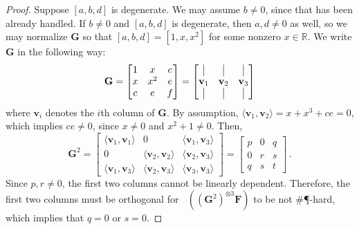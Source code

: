 \documentclass[11pt]{article}
\DeclareMathOperator{\holts}{Holant^*_3}
\newcommand{\sph}{\#\P-hard\xspace}
\newcommand{\teh}{^{\otimes 3}}
\begin{document}
\begin{proof}
  Suppose $[a, b, d]$ is degenerate.
  We may assume $b \ne 0$, since that has been already handled.
  If $b \ne 0$ and $[a, b, d]$ is degenerate, then $a, d \ne 0$ as well, so we may normalize $\mathbf{G}$ so that $[a, b, d] = [1, x, x^2]$ for some nonzero $x \in \mathbb{R}$.
  We write $\mathbf{G}$ in the following way:
  \[
    \mathbf{G} = \begin{bmatrix}
      1 & x & c \\
      x & x^2 & e \\
      c & e & f 
      \end{bmatrix} = \begin{bmatrix}
      \vrule & \vrule & \vrule \\
      \mathbf{v}_1 & \mathbf{v}_2 & \mathbf{v}_3 \\
      \vrule & \vrule & \vrule
    \end{bmatrix}
  \]
  where $\mathbf{v}_i$ denotes the $i$th column of $\mathbf{G}$. By assumption, $\langle \mathbf{v}_1, \mathbf{v}_2 \rangle = x + x^3 + ce = 0$, which implies $ce \ne 0$, since $x \ne 0$ and $x^2 + 1 \ne 0$.
  Then,
  \[
    \mathbf{G}^2 = \begin{bmatrix}
      \langle \mathbf{v}_1, \mathbf{v}_1 \rangle & 0 & \langle \mathbf{v}_1, \mathbf{v}_3 \rangle \\
      0 & \langle \mathbf{v}_2, \mathbf{v}_2 \rangle & \langle \mathbf{v}_2, \mathbf{v}_3 \rangle \\
      \langle \mathbf{v}_1, \mathbf{v}_3 \rangle & \langle \mathbf{v}_2, \mathbf{v}_3 \rangle & \langle \mathbf{v}_3, \mathbf{v}_3 \rangle 
      \end{bmatrix} = \begin{bmatrix}
      p & 0 & q \\
      0 & r & s \\
      q & s & t
    \end{bmatrix}
    \, .
  \]
  Since $p, r \ne 0$, the first two columns cannot be linearly dependent. 
  Therefore, the first two columns must be orthogonal for $\holts((\mathbf{G}^2)\teh \mathbf{F})$ to be not \sph, which implies that $q = 0$ or $s = 0$.


\end{proof}
\end{document}
